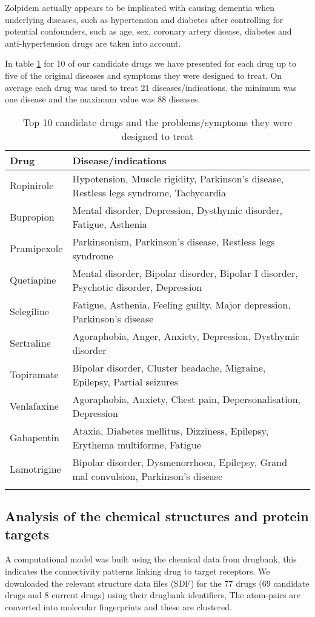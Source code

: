 \documentclass[preprint,11pt]{elsarticle}
\begin{document}
Zolpidem actually appears to be implicated with causing dementia when underlying diseases, such as hypertension and diabetes after controlling for potential confounders, such as age, sex, coronary artery disease, diabetes and anti-hypertension drugs are taken into account.


In table \ref{candidatetreats} for 10 of our candidate drugs we have presented for each drug up to five of the original diseases and symptoms they were designed to treat. On average each drug was used to treat 21 diseases/indications, the minimum was one disease and the maximum value was 88 diseases.

\begin{table}[h]
\scriptsize
  \centering \caption{Top 10 candidate drugs and the problems/symptoms they were designed to treat}\label{candidatetreats}
\centering
\begin{tabular}{ll}
  \hline
  Drug & Disease/indications \\ \hline
Ropinirole  & Hypotension, Muscle rigidity, Parkinson's disease, Restless legs syndrome, Tachycardia    \\
Bupropion  & Mental disorder, Depression, Dysthymic disorder, Fatigue, Asthenia\\        
Pramipexole & Parkinsonism, Parkinson's disease, Restless legs syndrome\\
Quetiapine & Mental disorder, Bipolar disorder, Bipolar I disorder,  Psychotic disorder, Depression\\
Selegiline   & Fatigue, Asthenia, Feeling guilty, Major depression, Parkinson's disease\\
Sertraline   & Agoraphobia, Anger, Anxiety, Depression, Dysthymic disorder\\    
Topiramate & Bipolar disorder, Cluster headache, Migraine, Epilepsy, Partial seizures\\
Venlafaxine & Agoraphobia, Anxiety, Chest pain, Depersonalisation, Depression   \\ 
Gabapentin & Ataxia, Diabetes mellitus, Dizziness, Epilepsy, Erythema multiforme, Fatigue  \\
Lamotrigine & Bipolar disorder, Dysmenorrhoea, Epilepsy, Grand mal convulsion, Parkinson's disease  \\
   \hline \normalsize
\end{tabular}
\end{table}

\subsection{Analysis of the chemical structures and protein targets}
A computational model was built using the chemical data from drugbank, this indicates the connectivity patterns linking drug to target receptors. We downloaded the relevant structure data files (SDF) for the 77 drugs (69 candidate drugs and 8 current drugs) using their drugbank identifiers, The atom-pairs are converted into molecular fingerprints and these are clustered. 
\end{document}
